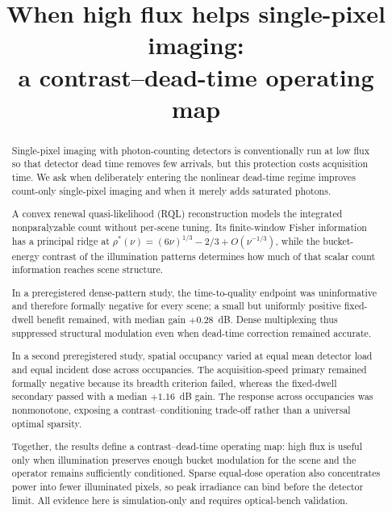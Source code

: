 \documentclass[10pt,twocolumn]{article}
\title{When high flux helps single-pixel imaging:\\
a contrast--dead-time operating map}
\author{\SPH{author block — user decision}}
\date{}
\begin{document}
\maketitle

\begin{abstract}
Single-pixel imaging with photon-counting detectors is conventionally run at
low flux so that detector dead time removes few arrivals, but this protection
costs acquisition time. We ask when deliberately entering the nonlinear
dead-time regime improves count-only single-pixel imaging and when it merely
adds saturated photons.

A convex renewal quasi-likelihood (RQL) reconstruction models the integrated
nonparalyzable count without per-scene tuning. Its finite-window Fisher
information has a principal ridge at
$\rho^{*}(\nu)=(6\nu)^{1/3}-2/3+O(\nu^{-1/3})$, while the bucket-energy
contrast of the illumination patterns determines how much of that scalar count
information reaches scene structure.

In a preregistered dense-pattern study, the time-to-quality endpoint was
uninformative and therefore formally negative for every scene; a small but
uniformly positive fixed-dwell benefit remained, with median gain
$+0.28$~dB. Dense multiplexing thus suppressed structural modulation even
when dead-time correction remained accurate.

In a second preregistered study, spatial occupancy varied at equal mean
detector load and equal incident dose across occupancies. The acquisition-speed
primary remained formally negative because its breadth criterion failed,
whereas the fixed-dwell secondary passed with a median $+1.16$~dB gain. The
response across occupancies was nonmonotone, exposing a contrast--conditioning
trade-off rather than a universal optimal sparsity.

Together, the results define a contrast--dead-time operating map: high flux is
useful only when illumination preserves enough bucket modulation for the scene
and the operator remains sufficiently conditioned. Sparse equal-dose operation
also concentrates power into fewer illuminated pixels, so peak irradiance can
bind before the detector limit. All evidence here is simulation-only and
requires optical-bench validation.
\end{abstract}
\end{document}
